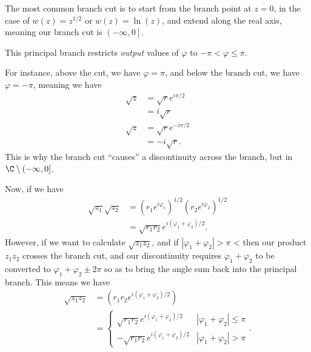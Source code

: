 \documentclass[10pt]{mypackage}
\begin{document}
\begin{example}
  The most common branch cut is to start from the branch point at $z = 0$, in the case of $w(z) = z^{1/2}$ or $w(z) = \ln(z)$, and extend along the real axis, meaning our branch cut is $\left( -\infty,0 \right]$.\newline

  This principal branch restricts \textit{output} values of $\varphi$ to $-\pi < \varphi \leq \pi$.\newline

  For instance, above the cut, we have $\varphi = \pi$, and below the branch cut, we have $\varphi = -\pi$, meaning we have
  \begin{align*}
    \sqrt{z} &= \sqrt{r}e^{i\pi /2}\tag*{$\varphi \to \pi$}\\
             &= i\sqrt{r}\\
    \sqrt{z} &= \sqrt{r}e^{-i\pi/2}\tag*{$\varphi \to -\pi$}\\
             &= -i\sqrt{r}.
  \end{align*}
  This is why the branch cut ``causes'' a discontinuity across the branch, but in $\C\setminus (-\infty,0]$.\newline

  Now, if we have
  \begin{align*}
    \sqrt{z_1}\sqrt{z_2} &= \left( r_1e^{i\varphi_1} \right)^{1/2}\left( r_2e^{i\varphi_2} \right)^{1/2}\\
                         &= \sqrt{r_1r_2}e^{i\left( \varphi_1 + \varphi_2 \right)/2}.
  \end{align*}
  However, if we want to calculate $\sqrt{z_1z_2}$, and if $\left\vert \varphi_1 + \varphi_2 \right\vert > \pi$ < then our product $z_1z_2$ crosses the branch cut, and our discontinuity requires $\varphi_1 + \varphi_2 $ to be converted to $\varphi_1 + \varphi_2 \pm 2\pi$ so as to bring the angle sum back into the principal branch. This means we have
  \begin{align*}
    \sqrt{z_1z_2} &= \left( r_1r_2e^{i\left( \varphi_1 + \varphi_2 \right)/2} \right)\\
                  &= \begin{cases}
                    \sqrt{r_1r_2}e^{i\left( \varphi_1 + \varphi_2 \right)/2} & \left\vert \varphi_1 + \varphi_2 \right\vert \leq \pi\\
                    -\sqrt{r_1r_2}e^{i\left( \varphi_1+\varphi_2 \right)/2} & \left\vert \varphi_1 + \varphi_2 \right\vert > \pi
                  \end{cases}.
  \end{align*}
\end{example}
\end{document}
